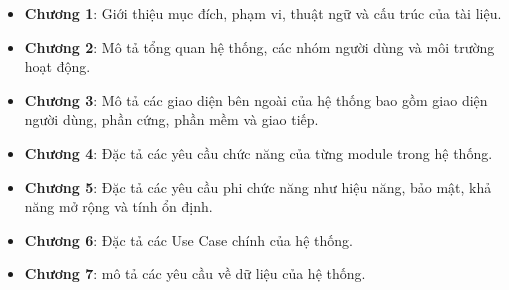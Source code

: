 \begin{itemize}
    \item \textbf{Chương 1}: Giới thiệu mục đích, phạm vi, thuật ngữ và cấu trúc của tài liệu.
    
    \item \textbf{Chương 2}: Mô tả tổng quan hệ thống, các nhóm người dùng và môi trường hoạt động.
    
    \item \textbf{Chương 3}: Mô tả các giao diện bên ngoài của hệ thống bao gồm giao diện người dùng, phần cứng, phần mềm và giao tiếp.
    
    \item \textbf{Chương 4}: Đặc tả các yêu cầu chức năng của từng module trong hệ thống.
    
    \item \textbf{Chương 5}: Đặc tả các yêu cầu phi chức năng như hiệu năng, bảo mật, khả năng mở rộng và tính ổn định.
    
    \item \textbf{Chương 6}: Đặc tả các Use Case chính của hệ thống.
    \item \textbf{Chương 7}: mô tả các yêu cầu về dữ liệu của hệ thống.
\end{itemize}

